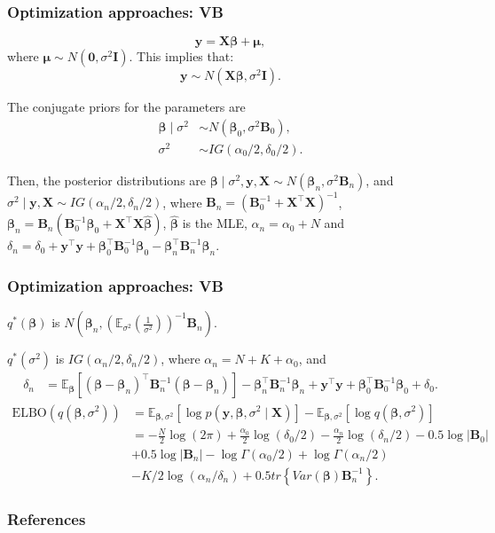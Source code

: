 \documentclass[12pt, compress]{beamer}
\begin{document}
\begin{frame}
	\frametitle{Optimization approaches: VB}
\[
\boldsymbol{y} = \boldsymbol{X} \boldsymbol{\beta} + \boldsymbol{\mu},
\]
where \( \boldsymbol{\mu} \sim N(\boldsymbol{0}, \sigma^2 \boldsymbol{I}) \). This implies that:
\[
\boldsymbol{y} \sim N(\boldsymbol{X} \boldsymbol{\beta}, \sigma^2 \boldsymbol{I}).\] 

The conjugate priors for the parameters are
\begin{align*}
	\boldsymbol{\beta}\mid \sigma^2 & \sim N(\boldsymbol{\beta}_0, \sigma^2 {\boldsymbol{B}}_0),\\
	\sigma^2 & \sim IG(\alpha_0/2, \delta_0/2).
\end{align*}

Then, the posterior distributions are $\boldsymbol{\beta}\mid \sigma^2, \boldsymbol{y}, \boldsymbol{X} \sim N(\boldsymbol{\beta}_n, \sigma^2\boldsymbol{B}_n)$, and 	$\sigma^2\mid  \boldsymbol{y}, \boldsymbol{X}\sim IG(\alpha_n/2, \delta_n/2)$, where $\boldsymbol{B}_n = (\boldsymbol{B}_0^{-1} + \boldsymbol{X}^{\top}\boldsymbol{X})^{-1}$, $\boldsymbol{\beta}_n = \boldsymbol{B}_n(\boldsymbol{B}_0^{-1}\boldsymbol{\beta}_0 + \boldsymbol{X}^{\top}\boldsymbol{X}\hat{\boldsymbol{\beta}})$, $\hat{\boldsymbol{\beta}}$ is the MLE, $\alpha_n = \alpha_0 + N$ and $\delta_n = \delta_0 + \boldsymbol{y}^{\top}\boldsymbol{y} + \boldsymbol{\beta}_0^{\top}\boldsymbol{B}_0^{-1}\boldsymbol{\beta}_0 - \boldsymbol{\beta}_n^{\top}\boldsymbol{B}_n^{-1}\boldsymbol{\beta}_n$.
\end{frame}

\begin{frame}
	\frametitle{Optimization approaches: VB}
 $q^*(\boldsymbol{\beta})$ is $N\left(\boldsymbol{\beta}_n,\left(\mathbb{E}_{\sigma^2}\left(\frac{1}{\sigma^2}\right)\right)^{-1}\boldsymbol{B}_n\right)$.

 $q^*(\sigma^2)$ is $IG(\alpha_n/2,\delta_n/2)$, where $\alpha_n=N+K+\alpha_0$, and
 {\footnotesize{
\begin{align*}
\delta_n&=\mathbb{E}_{\boldsymbol{\beta}}\left[(\boldsymbol{\beta}-\boldsymbol{\beta}_n)^{\top}\boldsymbol{B}_n^{-1}(\boldsymbol{\beta}-\boldsymbol{\beta}_n)\right]-\boldsymbol{\beta}_n^{\top}\boldsymbol{B}_n^{-1}\boldsymbol{\beta}_n+\boldsymbol{y}^{\top}\boldsymbol{y}+\boldsymbol{\beta}_0^{\top}\boldsymbol{B}_0^{-1}\boldsymbol{\beta}_0+\delta_0.
\end{align*} 
\begin{align*}
	\text{ELBO}(q(\boldsymbol{\beta},\sigma^2))&=\mathbb{E}_{\boldsymbol{\beta},\sigma^2}[\log p(\boldsymbol{y},\boldsymbol{\beta},\sigma^2\mid\boldsymbol{X})]-\mathbb{E}_{\boldsymbol{\beta},\sigma^2}[\log q(\boldsymbol{\beta},\sigma^2)]\\
	&=-\frac{N}{2}\log(2\pi)+\frac{\alpha_0}{2}\log(\delta_0/2)-\frac{\alpha_n}{2}\log(\delta_n/2)-0.5\log|\boldsymbol{B}_0|\\
	&+0.5\log|\boldsymbol{B}_n|-\log\Gamma(\alpha_0/2)+\log\Gamma(\alpha_n/2)\\
	&-K/2\log(\alpha_n/\delta_n)+0.5tr\left\{Var(\boldsymbol{\beta})\boldsymbol{B}_n^{-1}\right\}.
\end{align*}
}}
\end{frame}

\begin{frame}[allowframebreaks]
	\frametitle{References}
		{\footnotesize
		
		}
\end{frame}
\end{document}
